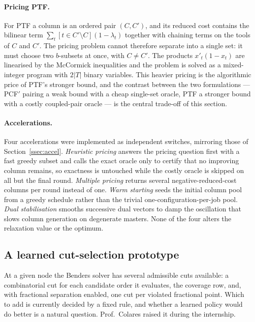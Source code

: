 \paragraph{Pricing PTF.}
For PTF a column is an ordered pair $(C,C')$, and its reduced cost contains the
bilinear term $\sum_t[t\in C'\setminus C](1-\lambda_t)$ together with chaining terms on
the tools of $C$ and $C'$. The pricing problem cannot therefore separate into a single
set: it must choose two $b$-subsets at once, with $C\ne C'$. The products
$x'_t(1-x_t)$ are linearised by the McCormick inequalities and the problem is solved as
a mixed-integer program with $2\lvert T\rvert$ binary variables. This heavier pricing
is the algorithmic price of PTF's stronger bound, and the contrast between the two
formulations --- PCF$'$ pairing a weak bound with a cheap single-set oracle, PTF a
stronger bound with a costly coupled-pair oracle --- is the central trade-off of this
section.

\paragraph{Accelerations.}
Four accelerations were implemented as independent switches, mirroring those of
Section~\ref{ssec:accel}. \emph{Heuristic pricing} answers the pricing question first
with a fast greedy subset and calls the exact oracle only to certify that no improving
column remains, so exactness is untouched while the costly oracle is skipped on all but
the final round. \emph{Multiple pricing} returns several negative-reduced-cost columns
per round instead of one. \emph{Warm starting} seeds the initial column pool from a
greedy schedule rather than the trivial one-configuration-per-job pool. \emph{Dual
stabilisation} \citep{Lubbecke2005} smooths successive dual vectors to damp the
oscillation that slows column generation on degenerate masters. None of the four
alters the relaxation value or the optimum.

\subsection{A learned cut-selection prototype}\label{ssec:rl}

At a given node the Benders solver has several admissible cuts available: a
combinatorial cut for each candidate order it evaluates, the coverage row, and, with
fractional separation enabled, one cut per violated fractional point. Which to add is
currently decided by a fixed rule, and whether a learned policy would do better is a
natural question. Prof.~Colares raised it during the internship.

